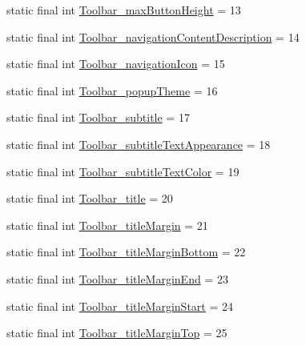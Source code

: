 \begin{DoxyCompactItemize}
\item 
static final int \mbox{\hyperlink{classcom_1_1synnapps_1_1carouselview_1_1_r_1_1styleable_ae3df7d9cae6548937fef9dd40c41a302}{Toolbar\+\_\+max\+Button\+Height}} = 13
\item 
static final int \mbox{\hyperlink{classcom_1_1synnapps_1_1carouselview_1_1_r_1_1styleable_a7a6308a5dfb02e8e6aad06a614a40e4d}{Toolbar\+\_\+navigation\+Content\+Description}} = 14
\item 
static final int \mbox{\hyperlink{classcom_1_1synnapps_1_1carouselview_1_1_r_1_1styleable_abd8f424722850c3aea3cdcca60164865}{Toolbar\+\_\+navigation\+Icon}} = 15
\item 
static final int \mbox{\hyperlink{classcom_1_1synnapps_1_1carouselview_1_1_r_1_1styleable_a1c13ac88c11a7ac4d0295f1d5c10a3f5}{Toolbar\+\_\+popup\+Theme}} = 16
\item 
static final int \mbox{\hyperlink{classcom_1_1synnapps_1_1carouselview_1_1_r_1_1styleable_af062a35d615ce7c40d4f0ad7145030a8}{Toolbar\+\_\+subtitle}} = 17
\item 
static final int \mbox{\hyperlink{classcom_1_1synnapps_1_1carouselview_1_1_r_1_1styleable_ac41e2e18e1535169b5a4d3b19c9f50bd}{Toolbar\+\_\+subtitle\+Text\+Appearance}} = 18
\item 
static final int \mbox{\hyperlink{classcom_1_1synnapps_1_1carouselview_1_1_r_1_1styleable_aee23aa27fb623a4ff66d55fc4326370b}{Toolbar\+\_\+subtitle\+Text\+Color}} = 19
\item 
static final int \mbox{\hyperlink{classcom_1_1synnapps_1_1carouselview_1_1_r_1_1styleable_aad1719274beba218e8fe8a4201e6a353}{Toolbar\+\_\+title}} = 20
\item 
static final int \mbox{\hyperlink{classcom_1_1synnapps_1_1carouselview_1_1_r_1_1styleable_a09ba85e26bc220d19703cc6500eb2ff9}{Toolbar\+\_\+title\+Margin}} = 21
\item 
static final int \mbox{\hyperlink{classcom_1_1synnapps_1_1carouselview_1_1_r_1_1styleable_a49479a713ef4b168cda2270a4e3b560c}{Toolbar\+\_\+title\+Margin\+Bottom}} = 22
\item 
static final int \mbox{\hyperlink{classcom_1_1synnapps_1_1carouselview_1_1_r_1_1styleable_ab859429191ffd91b0856f3aeea949d82}{Toolbar\+\_\+title\+Margin\+End}} = 23
\item 
static final int \mbox{\hyperlink{classcom_1_1synnapps_1_1carouselview_1_1_r_1_1styleable_a9efccd48a0bac8522331edda11dde18b}{Toolbar\+\_\+title\+Margin\+Start}} = 24
\item 
static final int \mbox{\hyperlink{classcom_1_1synnapps_1_1carouselview_1_1_r_1_1styleable_aa6e2b914cf7c231e7bd23ca0c5a203f3}{Toolbar\+\_\+title\+Margin\+Top}} = 25

\end{DoxyCompactItemize}
